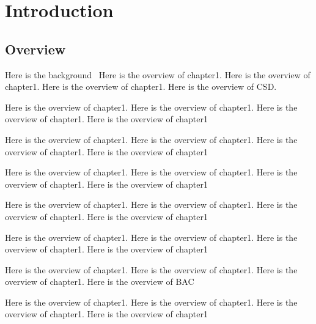\ifx\allfiles\undefined   
	
\else

\fi

\chapter{Introduction}
\section{Overview}
Here is the background~\citep{MHzcompact}
Here is the overview of chapter1. Here is the overview of chapter1. Here is the overview of chapter1. Here is the overview of CSD. 

Here is the overview of chapter1. Here is the overview of chapter1. Here is the overview of chapter1. Here is the overview of chapter1

Here is the overview of chapter1. Here is the overview of chapter1. Here is the overview of chapter1. Here is the overview of chapter1

Here is the overview of chapter1. Here is the overview of chapter1. Here is the overview of chapter1. Here is the overview of chapter1

Here is the overview of chapter1. Here is the overview of chapter1. Here is the overview of chapter1. Here is the overview of chapter1

Here is the overview of chapter1. Here is the overview of chapter1. Here is the overview of chapter1. Here is the overview of chapter1

Here is the overview of chapter1. Here is the overview of chapter1. Here is the overview of chapter1. Here is the overview of BAC

Here is the overview of chapter1. Here is the overview of chapter1. Here is the overview of chapter1. Here is the overview of chapter1

